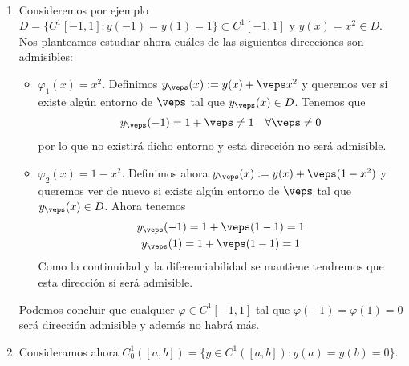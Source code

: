 \begin{ejemplo}\
    \begin{enumerate}
        \item Consideremos por ejemplo $D=\{C^1[-1,1] : y(-1)=y(1)=1\}\subset C^1[-1,1]$ y $y(x)=x^2\in D$. Nos planteamos estudiar ahora cuáles de las siguientes direcciones son admisibles:
        \begin{itemize}
            \item $\varphi_1(x) = x^2$. Definimos $y_\veps(x):= y(x) + \veps x^2$ y queremos ver si existe algún entorno de $\veps$ tal que $y_\veps(x)\in D$. Tenemos que 
            \begin{gather*}
                y_\veps(-1) = 1 + \veps \neq 1\ \ \ \forall \veps\neq 0
            \end{gather*}
            por lo que no existirá dicho entorno y esta dirección no será admisible.
            \item $\varphi_2(x) = 1-x^2$. Definimos ahora $y_\veps(x):= y(x) + \veps (1 - x^2)$ y queremos ver de nuevo si existe algún entorno de $\veps$ tal que $y_\veps(x)\in D$. Ahora tenemos
            \begin{gather*}
                y_\veps(-1) = 1 + \veps(1-1) = 1\\
                y_\veps(1) = 1 + \veps(1-1) = 1
            \end{gather*}
            Como la continuidad y la diferenciabilidad se mantiene tendremos que esta dirección sí será admisible.
        \end{itemize}
        Podemos concluir que cualquier $\varphi\in C^1[-1,1]$ tal que $\varphi(-1)=\varphi(1)=0$ será dirección admisible y además no habrá más.

        \item Consideramos ahora $C_0^1([a,b]) = \{y\in C^1([a,b]) : y(a)=y(b)=0\}$.
    \end{enumerate}
\end{ejemplo}

